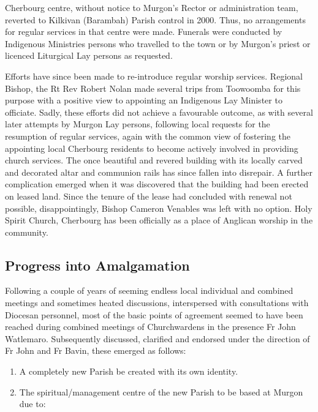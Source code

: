 Cherbourg centre, without notice to Murgon's Rector or administration team, reverted to Kilkivan (Barambah) Parish control in 2000. Thus, no arrangements for regular services in that centre were made. Funerals were conducted by Indigenous Ministries persons who travelled to the town or by Murgon's priest or licenced Liturgical Lay persons as requested.



Efforts have since been made to re-introduce regular worship services. Regional Bishop, the Rt Rev Robert Nolan made several trips from Toowoomba for this purpose with a positive view to appointing an Indigenous Lay Minister to officiate. Sadly, these efforts did not achieve a favourable outcome, as with several later attempts by Murgon Lay persons, following local requests for the resumption of regular services, again with the common view of fostering the appointing local Cherbourg residents to become actively involved in providing church services. The once beautiful and revered building with its locally carved and decorated altar and communion rails has since fallen into disrepair. A further complication emerged when it was discovered that the building had been erected on leased land. Since the tenure of the lease had concluded with renewal not possible, disappointingly, Bishop Cameron Venables was left with no option. Holy Spirit Church, Cherbourg has been officially as a place of Anglican worship in the community.



\subsection{Progress into Amalgamation}



Following a couple of years of seeming endless local individual and combined meetings and sometimes heated discussions, interspersed with consultations with Diocesan personnel, most of the basic points of agreement seemed to have been reached during combined meetings of Churchwardens in the presence Fr John Watlemaro. Subsequently discussed, clarified and endorsed under the direction of Fr John and Fr Bavin, these emerged as follows:



\begin{enumerate}

\def\labelenumi{\arabic{enumi}.}

\item

  A completely new Parish be created with its own identity.

\item

  The spiritual/management centre of the new Parish to be based at Murgon due to:

\end{enumerate}



